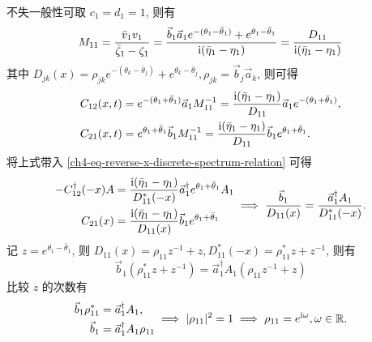 不失一般性可取 $c_{1} = d_{1} = 1$, 则有
\begin{equation}
    M_{11} = \frac{\bar{v}_{1} v_{1}}{\bar{\zeta}_{1} - \zeta_{1}} = \frac{\vec{b}_{1} \vec{a}_{1} e^{-(\theta_{1} - \bar{\theta}_{1})} + e^{\theta_{1} - \bar{\theta}_{1}}}{\mathrm{i} (\bar{\eta}_{1} - \eta_{1})} = \frac{D_{11}}{\mathrm{i} (\bar{\eta}_{1} - \eta_{1})}
\end{equation}
其中 $D_{jk}(x) = \rho_{jk} e^{-(\theta_{k} - \bar{\theta}_{j})} +  e^{\theta_{k} - \bar{\theta}_{j}}, \rho_{jk} = \vec{b}_{j} \vec{a}_{k}$, 则可得
\begin{equation}
    \begin{aligned}
        C_{12}(x,t) & = e^{-(\theta_{1}+\bar{\theta}_{1})} \vec{a}_{1} M_{11}^{-1} = \frac{\mathrm{i} (\bar{\eta}_{1} - \eta_{1})}{D_{11}} \vec{a}_{1} e^{-(\theta_{1}+\bar{\theta}_{1})}, \\
        C_{21}(x,t) & = e^{\theta_{1}+\bar{\theta}_{1}} \vec{b}_{1} M_{11}^{-1} = \frac{\mathrm{i} (\bar{\eta}_{1} - \eta_{1})}{D_{11}} \vec{b}_{1} e^{\theta_{1}+\bar{\theta}_{1}}.
    \end{aligned}
\end{equation}
将上式带入 \eqref{ch4-eq-reverse-x-discrete-spectrum-relation} 可得
\begin{equation}
    \begin{aligned}
        -C_{12}^{\dagger}(-x)A & = \frac{\mathrm{i}(\bar{\eta}_{1} - \eta_{1})}{D_{11}^{*}(-x)}\vec{a}_{1}^{\dagger}e^{\theta_{1}+\bar{\theta}_{1}} A_{1} \\
        C_{21}(x)              & = \frac{\mathrm{i} (\bar{\eta}_{1} - \eta_{1})}{D_{11}(x)} \vec{b}_{1} e^{\theta_{1}+\bar{\theta}_{1}}
    \end{aligned}
    \implies \frac{\vec{b}_{1}}{D_{11}(x)} = \frac{\vec{a}_{1}^{\dagger} A_{1}}{D_{11}^{*}(-x)}.
\end{equation}
记 $z = e^{\theta_{1} - \bar{\theta}_{1}}$, 则 $D_{11}(x) = \rho_{11} z^{-1} + z, D_{11}^{*}(-x) = \rho_{11}^{*} z + z^{-1}$, 则有
\begin{equation}
    \vec{b}_{1} (\rho_{11}^{*} z + z^{-1}) =\vec{a}_{1}^{\dagger} A_{1} (\rho_{11} z^{-1} + z)
\end{equation}
比较 $z$ 的次数有
\begin{equation}
    \begin{aligned}
        \vec{b}_{1} \rho_{11}^{*} & =\vec{a}_{1}^{\dagger}A_{1},          \\
        \vec{b}_{1}               & =\vec{a}_{1}^{\dagger}A_{1} \rho_{11}
    \end{aligned} \implies |\rho_{11}|^{2} = 1 \implies \rho_{11} = e^{\mathrm{i} \omega}, \omega \in \mathbb{R}.
\end{equation}
